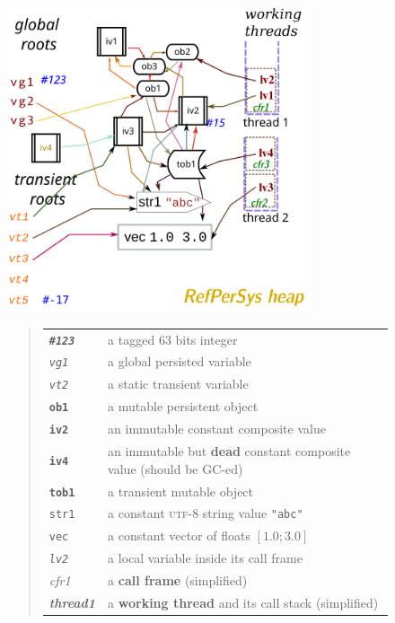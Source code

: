 \documentclass[11pt,a4paper,svgnames]{article}
\begin{document}
\begin{figure}[H]
  \begin{center}
    \includegraphics[width=0.8\textwidth]{heap-refpersys}
  \end{center}

\begin{quote}
  \begin{relsize}{-0.2}
    \begin{tabular}{ll}
      \texttt{\textbf{\textit{\#123}}} & a tagged 63 bits integer \\
      \texttt{\textit{vg1}} & a global persisted variable \\
      \texttt{\textit{vt2}} & a static transient variable \\
      \texttt{\textbf{ob1}} & a mutable persistent object \\
      \texttt{\textbf{iv2}} & an immutable constant composite value \\
      \texttt{\textbf{iv4}} & an immutable but \textbf{dead} constant composite value (should be GC-ed) \\
      \texttt{\textbf{tob1}} & a transient mutable object \\
      \texttt{str1} & a constant \textsc{utf-8} string value \texttt{"abc"} \\
      \texttt{vec} & a constant vector of floats {$ [1.0; 3.0] $} \\
      \texttt{\textit{lv2}} & a local variable inside its call frame \\
      \textit{cfr1} &  a \textbf{call frame} (simplified) \\
      \textit{\textbf{thread1}} & a \textbf{working thread} and its call stack (simplified) \\
    \end{tabular}
    \medskip


\end{relsize}
\end{quote}
\end{figure}
\end{document}

